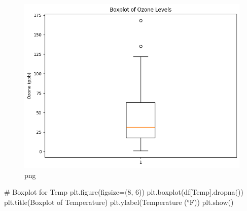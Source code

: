 \documentclass[
  letterpaper,
  DIV=11,
  numbers=noendperiod]{scrreprt}
\newenvironment{Shaded}{\begin{snugshade}}{\end{snugshade}}
\newcommand{\CommentTok}[1]{\textcolor[rgb]{0.37,0.37,0.37}{#1}}
\newcommand{\DecValTok}[1]{\textcolor[rgb]{0.68,0.00,0.00}{#1}}
\newcommand{\NormalTok}[1]{\textcolor[rgb]{0.00,0.23,0.31}{#1}}
\newcommand{\OperatorTok}[1]{\textcolor[rgb]{0.37,0.37,0.37}{#1}}
\newcommand{\StringTok}[1]{\textcolor[rgb]{0.13,0.47,0.30}{#1}}
\begin{document}
\begin{figure}[H]

{\centering \includegraphics{Tut2_Python_Olufawo_09_21_24_files/Tut2_Python_Olufawo_09_21_24_9_0.png}

}

\caption{png}

\end{figure}%

\begin{Shaded}
\begin{Highlighting}[]
\CommentTok{\# Boxplot for Temp}
\NormalTok{plt.figure(figsize}\OperatorTok{=}\NormalTok{(}\DecValTok{8}\NormalTok{, }\DecValTok{6}\NormalTok{))}
\NormalTok{plt.boxplot(df[}\StringTok{\textquotesingle{}Temp\textquotesingle{}}\NormalTok{].dropna())}
\NormalTok{plt.title(}\StringTok{\textquotesingle{}Boxplot of Temperature\textquotesingle{}}\NormalTok{)}
\NormalTok{plt.ylabel(}\StringTok{\textquotesingle{}Temperature (°F)\textquotesingle{}}\NormalTok{)}
\NormalTok{plt.show()}
\end{Highlighting}
\end{Shaded}
\end{document}
